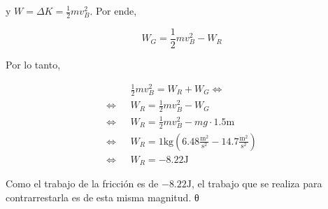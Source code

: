\documentclass[12pt]{article}
\theoremstyle{definition}
\begin{document}
y $W = \Delta K = \frac{1}{2}mv_B^2$. Por ende, 

\begin{equation*}
    W_G = \frac{1}{2}mv_B^2 - W_R
\end{equation*}

Por lo tanto, 

\begin{align*}
    &\frac{1}{2}mv_B^2  = W_R + W_G \iff \\ 
    \iff ~ ~ ~ 
    &W_R = \frac{1}{2}mv_B^2 - W_G\\ 
    \iff ~ ~ ~ 
    &W_R = \frac{1}{2}mv_B^2 - mg \cdot 1.5\text{m} \\ 
    \iff ~ ~ ~  
    &W_R = \text{1kg}\left( 6.48 \frac{\text{m}^2}{\text{s}^2} - 14.7
    \frac{\text{m}^2}{\text{s}^2} \right) \\ 
    \iff &W_R = -8.22\text{J}
\end{align*}

Como el trabajo de la fricción es de $-8.22\text{J}$, el trabajo que se realiza
para contrarrestarla es de esta misma magnitud. θ
\end{document}
